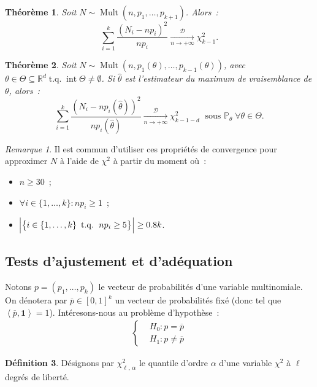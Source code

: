 \documentclass{report}
\DeclareMathOperator{\tq}{\text{ t.q. }}
\DeclareMathOperator{\Mult}{Mult}
\DeclareMathOperator{\intr}{int}  %
\renewcommand{\P}{\mathbb P}
\newcommand{\pinfty}{{+\infty}}
\newcommand{\cvgd}{\xrightarrow[n \to \pinfty]{\mathcal D}}
\newcommand{\scpr}[2]{\left\langle#1, #2\right\rangle}
\newcommand{\R}{\mathbb R}
\newtheorem{thm}{Théorème}[chapter]
\theoremstyle{definition}
\newtheorem{déf}[thm]{Définition}
\theoremstyle{remark}
\newtheorem*{rmq}{Remarque}
\begin{document}
			\begin{thm}\label{thm:test_hyp_multi} Soit $N \sim \Mult(n, p_1, \ldots, p_{k+1})$. Alors~:
			\[\sum_{i=1}^k\frac {(N_i - np_i)^2}{np_i} \cvgd \chi_{k-1}^2.\]
			\end{thm}

			\begin{thm}\label{thm:test_hyp_multi_param} Soit $N \sim \Mult(n, p_1(\theta), \ldots, p_{k-1}(\theta))$, avec
			$\theta \in \Theta \subseteq \R^d \tq \intr \Theta \neq \emptyset$. Si $\hat \theta$ est l'estimateur du maximum de vraisemblance de $\theta$, alors~:
			\[\sum_{i=1}^k\frac {(N_i - np_i(\hat \theta))^2}{np_i(\hat \theta)} \cvgd \chi^2_{k-1-d}\;\text{ sous } \P_\theta \; \forall \theta \in \Theta.\]
			\end{thm}

			\begin{rmq} Il est commun d'utiliser ces propriétés de convergence pour approximer $N$ à l'aide de $\chi^2$ à partir du moment où~:
			\begin{itemize}
				\item $n \geq 30$~;
				\item $\forall i \in \{1, \ldots, k\} : np_i \geq 1$~;
				\item $\abs {\left\{i \in \{1, \ldots, k\} \tq np_i \geq 5\right\}} \geq 0.8k$.
			\end{itemize}
			\end{rmq}

		\subsection{Tests d'ajustement et d'adéquation}
			Notons $p = (p_1, \ldots, p_k)$ le vecteur de probabilités d'une variable multinomiale. On dénotera par $\overline p \in [0, 1]^k$ un vecteur de
			probabilités fixé (donc tel que $\scpr {\overline p}{\mathbf 1} = 1$). Intéresons-nous au problème d'hypothèse~:
			\begin{align}\label{eq:test_hyp_multi}
				\begin{cases}
					&H_0 : p = \overline p \\
					&H_1 : p \neq \overline p
				\end{cases}
			\end{align}

			\begin{déf} Désignons par $\chi^2_{\ell,\,\alpha}$ le quantile d'ordre $\alpha$ d'une variable $\chi^2$ à $\ell$ degrés de liberté.
			\end{déf}
\end{document}
